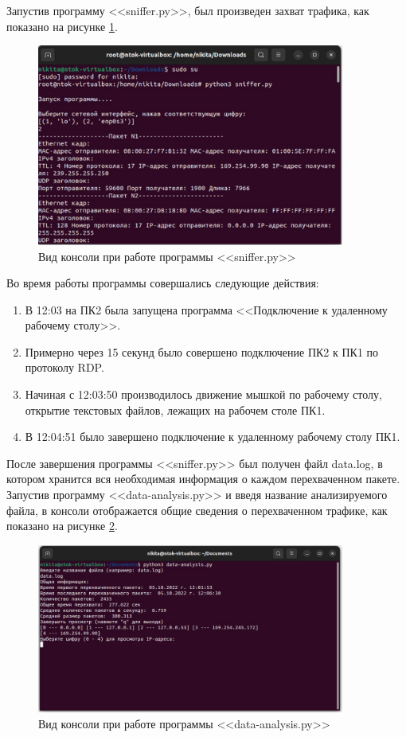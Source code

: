 \documentclass[bachelor, och, coursework]{SCWorks}
\begin{document}
  Запустив программу <<sniffer.py>>, был произведен захват трафика, как показано на рисунке \ref{cmd-strt}.
  
  \begin{figure}[H]
    \centering
    \includegraphics[width=0.9\textwidth]{photo/cmd-start.jpg}
    \caption{Вид консоли при работе программы <<sniffer.py>>}
    \label{cmd-strt}
  \end{figure}
  
  Во время работы программы совершались следующие действия:

  \begin{enumerate}
    \item В 12:03 на ПК2 была запущена программа <<Подключение к удаленному рабочему столу>>.
    \item Примерно через 15 секунд было совершено подключение ПК2 к ПК1 по протоколу RDP.
    \item Начиная с 12:03:50 производилось движение мышкой по рабочему столу, открытие текстовых файлов, лежащих на рабочем 
    столе ПК1.
    \item В 12:04:51 было завершено подключение к удаленному рабочему столу ПК1.
  \end{enumerate}
  
  После завершения программы <<sniffer.py>> был получен файл data.log, в котором хранится вся необходимая информация о каждом перехваченном пакете.
  Запустив программу <<data-analysis.py>> и введя название анализируемого файла, в консоли отображается общие сведения о перехваченном трафике, как показано
  на рисунке \ref{cmd-strt2}.
  
  \begin{figure}[H]
    \centering
    \includegraphics[width=0.9\textwidth]{photo/cmd-start2.jpg}
    \caption{Вид консоли при работе программы <<data-analysis.py>>}
    \label{cmd-strt2}
  \end{figure}
\end{document}
